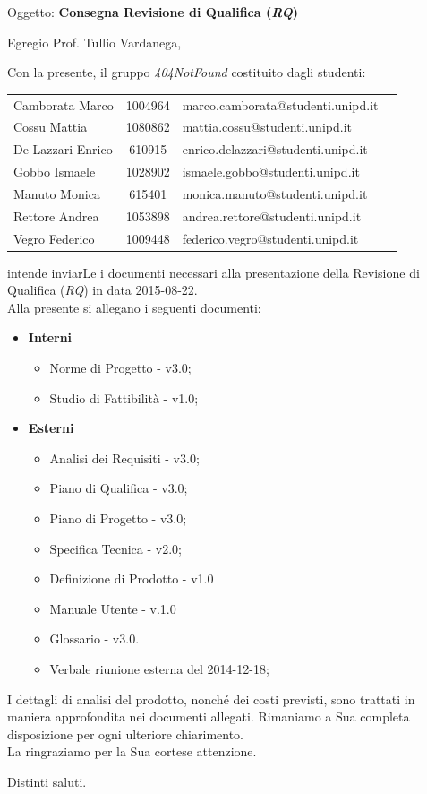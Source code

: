 \documentclass[a4paper,10pt]{letter}
\newcommand{\gruppo}{404NotFound}
\newcommand{\Vardanega}{Prof. Tullio Vardanega}
\newcommand{\VeFe}{Vegro Federico}
\newcommand{\CaMa}{Camborata Marco}
\newcommand{\GoIs}{Gobbo Ismaele}
\newcommand{\DeEn}{De Lazzari Enrico}
\newcommand{\CoMa}{Cossu Mattia}
\newcommand{\ReAn}{Rettore Andrea}
\newcommand{\MaMo}{Manuto Monica}
\begin{document}
	
	\begin{letter}{Oggetto: \textbf{Consegna Revisione di Qualifica (\textit{RQ})}}
	\opening {Egregio \Vardanega ,}
	Con la presente, il gruppo \textit{\gruppo} costituito dagli studenti: 
		\begin{center}
		\begin{tabular}{l c l c}					
		\CaMa & 1004964 & marco.camborata@studenti.unipd.it \\
		\CoMa & 1080862 & mattia.cossu@studenti.unipd.it\\
		\DeEn & 610915  & enrico.delazzari@studenti.unipd.it\\ 
		\GoIs & 1028902 & ismaele.gobbo@studenti.unipd.it\\
		\MaMo & 615401  & monica.manuto@studenti.unipd.it\\
		\ReAn & 1053898 & andrea.rettore@studenti.unipd.it\\
		\VeFe & 1009448 & federico.vegro@studenti.unipd.it\\
		\end{tabular}
		\end{center}
	intende inviarLe i documenti necessari alla presentazione della Revisione di Qualifica (\textit{RQ}) in data 2015-08-22.\\
    Alla presente si allegano i seguenti documenti:
			\begin{itemize}
				\item \textbf{Interni}
					\begin{itemize}
						\item Norme di Progetto - v3.0;
						\item Studio di Fattibilità - v1.0;
					\end{itemize}
				\item \textbf{Esterni}
					\begin{itemize}
						\item Analisi dei Requisiti - v3.0;
						\item Piano di Qualifica - v3.0;
						\item Piano di Progetto - v3.0;
						\item Specifica Tecnica - v2.0;	
						\item Definizione di Prodotto - v1.0
						\item Manuale Utente - v.1.0									
						\item Glossario - v3.0.
						\item Verbale riunione esterna del 2014-12-18;	
					\end{itemize}
			\end{itemize} 
		I dettagli di analisi del prodotto, nonché dei costi previsti, sono trattati in maniera approfondita nei documenti allegati. Rimaniamo a Sua completa disposizione per ogni ulteriore chiarimento.\\ 
		La ringraziamo per la Sua cortese attenzione.
\thispagestyle{fancy}
\closing{Distinti saluti.}
   \end{letter}
\end{document}
